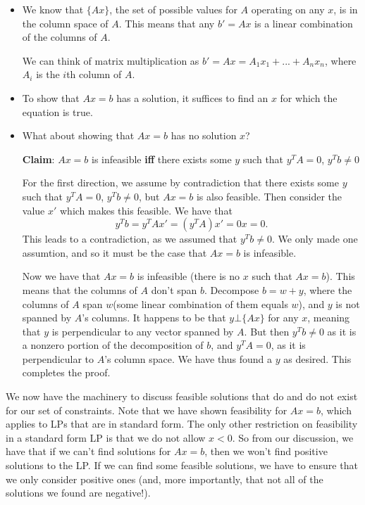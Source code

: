 \documentclass{article}
\begin{document}
\begin{itemize}
 \item We know that $\{Ax\}$, the set of possible values for $A$
	operating on any $x$, is in the column space of $A$.  This means
	that any $b' = Ax$ is a linear combination of the columns of $A$.

	We can think of matrix multiplication as $b' = Ax = A_1x_1 + ... + A_nx_n$,
	where $A_i$ is the $i$th column of $A$.

\item To show that $Ax = b$ has a solution, it suffices to find an $x$ for which the equation is true.

\item What about showing that $Ax = b$ has no solution $x$?

\textbf{Claim}: $Ax = b$ is infeasible \textbf{iff} there exists some $y$ such that $y^TA = 0$, $y^Tb \neq 0$

For the first direction, we assume by contradiction that there exists some $y$ such that $y^TA = 0$, $y^Tb \neq 0$, but $Ax=b$ is also feasible.  Then consider the value $x'$ which makes this feasible.  We have that $$y^Tb = y^TAx' = (y^TA)x' = 0x = 0.$$  This leads to a contradiction, as we assumed that $y^Tb \neq 0$.  We only made one assumtion, and so it must be the case that $Ax = b$ is infeasible.

Now we have that $Ax=b$ is infeasible (there is no $x$ such that $Ax=b$).  This means that the columns of $A$ don't span $b$.  Decompose $b = w + y$, where the columns of $A$ span $w$(some linear combination of them equals $w$), and $y$ is not spanned by $A$'s columns.  It happens to be that $y \bot \{Ax\}$ for any $x$, meaning that $y$ is perpendicular to any vector spanned by $A$.  But then $y^Tb \neq 0$ as it is a nonzero portion of the decomposition of $b$, and $y^TA = 0$, as it is perpendicular to $A$'s column space.  We have thus found a $y$ as desired.  This completes the proof.
\end{itemize}

We now have the machinery to discuss feasible solutions that do and do not exist for our set of constraints.  Note that we have shown feasibility for $Ax=b$, which applies to LPs that are in standard form.  The only other restriction on feasibility in a standard form LP is that we do not allow $x < 0$.  So from our discussion, we have that if we can't find solutions for $Ax = b$, then we won't find positive solutions to the LP.  If we can find some feasible solutions, we have to ensure that we only consider positive ones (and, more importantly, that not all of the solutions we found are negative!).
\end{document}
